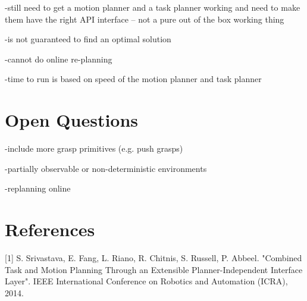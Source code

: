 \documentclass[12pt]{article}
\begin{document}
-still need to get a motion planner and a task planner working and need to make them have the right API interface -- not a pure out of the box working thing

-is not guaranteed to find an optimal solution

-cannot do online re-planning

-time to run is based on speed of the motion planner and task planner

\section{Open Questions}

-include more grasp primitives (e.g. push grasps)

-partially observable or non-deterministic environments

-replanning online

\section{References}

[1] S. Srivastava, E. Fang, L. Riano, R. Chitnis, S. Russell, P. Abbeel. "Combined Task and Motion Planning Through an Extensible Planner-Independent Interface Layer". IEEE International Conference on Robotics and Automation (ICRA), 2014.
\end{document}

